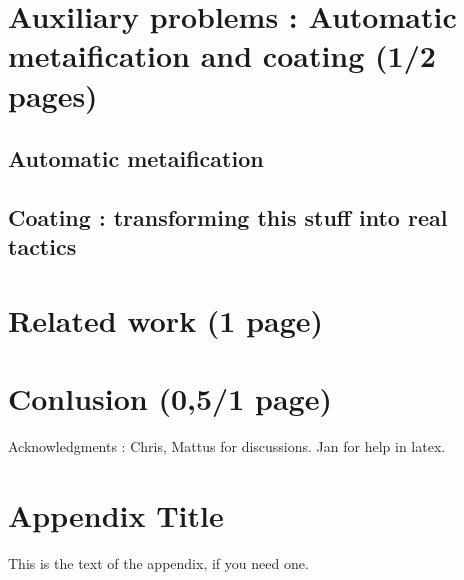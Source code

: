 \documentclass{sigplanconf}
\begin{document}
\section {Auxiliary problems : Automatic metaification and coating (1/2 pages)}

	\subsection {Automatic metaification}

	\subsection {Coating : transforming this stuff into real tactics}

\section {Related work (1 page)}

\section {Conlusion (0,5/1 page)}


\acks

Acknowledgments : Chris, Mattus for discussions. Jan for help in latex.





\appendix
\section{Appendix Title}

This is the text of the appendix, if you need one.
\end{document}
